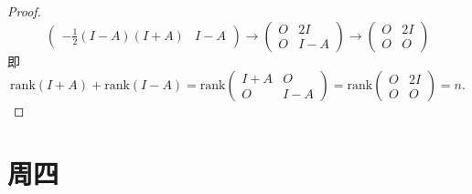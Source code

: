 \documentclass{article}
\begin{document}
\begin{enumerate}
\begin{proof}
\[\begin{pmatrix}
                    -\frac{1}{2}(I-A)(I+A) & I-A
                \end{pmatrix}
                \longrightarrow
                \begin{pmatrix}
                    O & 2I\\
                    O & I-A
                \end{pmatrix}
                \longrightarrow
                \begin{pmatrix}
                    O & 2I\\
                    O & O
                \end{pmatrix}
            \]
            即
            \[
                \mbox{rank}(I+A)+\mbox{rank}(I-A)=
                \mbox{rank}\begin{pmatrix}
                    I+A & O\\
                    O & I-A
                \end{pmatrix}=
                \mbox{rank}\begin{pmatrix}
                    O & 2I\\
                    O & O
                \end{pmatrix}
                =n.
            \]
        \end{proof}
    \end{enumerate}
\section{周四}
\end{document}
